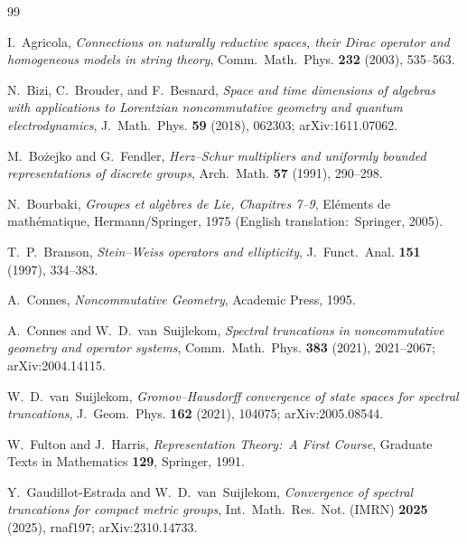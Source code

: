 \documentclass[11pt,a4paper]{article}
\theoremstyle{plain}
\theoremstyle{definition}
\begin{document}

\begin{thebibliography}{99}

I.~Agricola,
\newblock \emph{Connections on naturally reductive spaces, their Dirac
operator and homogeneous models in string theory},
\newblock Comm.~Math.~Phys. \textbf{232} (2003), 535--563.

N.~Bizi, C.~Brouder, and F.~Besnard,
\newblock \emph{Space and time dimensions of algebras with applications
to Lorentzian noncommutative geometry and quantum electrodynamics},
\newblock J.~Math.~Phys. \textbf{59} (2018), 062303;
\newblock arXiv:1611.07062.

M.~Bo{\.z}ejko and G.~Fendler,
\newblock \emph{Herz--Schur multipliers and uniformly bounded
representations of discrete groups},
\newblock Arch.~Math. \textbf{57} (1991), 290--298.

N.~Bourbaki,
\newblock \emph{Groupes et alg\`ebres de Lie, Chapitres 7--9},
\newblock El\'ements de math\'ematique, Hermann/Springer, 1975
(English translation:\ Springer, 2005).

T.~P.~Branson,
\newblock \emph{Stein--Weiss operators and ellipticity},
\newblock J.~Funct.~Anal. \textbf{151} (1997), 334--383.

A.~Connes,
\newblock \emph{Noncommutative Geometry},
\newblock Academic Press, 1995.

A.~Connes and W.~D.~van~Suijlekom,
\newblock \emph{Spectral truncations in noncommutative geometry and
operator systems},
\newblock Comm.~Math.~Phys. \textbf{383} (2021), 2021--2067;
\newblock arXiv:2004.14115.

W.~D.~van~Suijlekom,
\newblock \emph{Gromov--Hausdorff convergence of state spaces for
spectral truncations},
\newblock J.~Geom.~Phys. \textbf{162} (2021), 104075;
\newblock arXiv:2005.08544.

W.~Fulton and J.~Harris,
\newblock \emph{Representation Theory:\ A First Course},
\newblock Graduate Texts in Mathematics \textbf{129},
Springer, 1991.

Y.~Gaudillot-Estrada and W.~D.~van~Suijlekom,
\newblock \emph{Convergence of spectral truncations for compact metric
groups},
\newblock Int.~Math.~Res.~Not. (IMRN) \textbf{2025} (2025), rnaf197;
\newblock arXiv:2310.14733.


\end{thebibliography}
\end{document}
